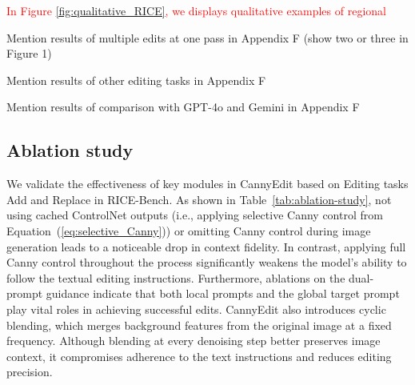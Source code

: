 \documentclass{article}
\begin{document}
\textcolor{red}{In Figure \ref{fig:qualitative_RICE}, we displays qualitative examples of regional }





Mention results of multiple edits at one pass in Appendix F (show two or three in Figure 1)

Mention results of other editing tasks in Appendix F

Mention results of comparison with GPT-4o and Gemini in Appendix F



\subsection{Ablation study}

We validate the effectiveness of key modules in CannyEdit based on Editing tasks Add and Replace in RICE-Bench.  As shown in Table~\ref{tab:ablation-study}, not using cached ControlNet outputs (i.e., applying selective Canny control from Equation~(\ref{eq:selective_Canny})) or omitting Canny control during image generation leads to a noticeable drop in context fidelity. In contrast, applying full Canny control throughout the process significantly weakens the model's ability to follow the textual editing instructions. Furthermore, ablations on the dual-prompt guidance indicate that both local prompts and the global target prompt play vital roles in achieving successful edits. CannyEdit also introduces cyclic blending, which merges background features from the original image at a fixed frequency. Although blending at every denoising step better preserves image context, it compromises adherence to the text instructions and reduces editing precision. 

\end{document}
